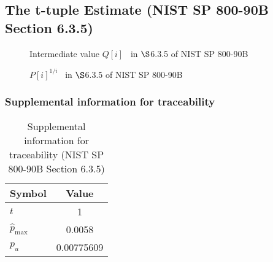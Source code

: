 \documentclass[a3paper,xelatex,english]{bxjsarticle}
\begin{document}
\subsection{The t-tuple Estimate (NIST SP 800-90B Section 6.3.5)}\label{sec:NonBinary635}

\begin{figure}[htbp]
\centering


\caption{Intermediate value $Q[i]$ \, in $\S$6.3.5 of NIST SP 800-90B}
\end{figure}
\begin{figure}[htbp]
\centering


\caption{$P[i]^{1/i}$ \, in $\S$6.3.5 of NIST SP 800-90B}
\end{figure}
\clearpage
\subsubsection{Supplemental information for traceability}
\renewcommand{\arraystretch}{1.8}
\begin{table}[h]
\caption{Supplemental information for traceability (NIST SP 800-90B Section 6.3.5)}
\begin{center}
\begin{tabular}{|l|c|}
\hline 
\rowcolor{anotherlightblue} %
Symbol				& Value \\ \hline 
$t$				&        1\\ \hline 
$\hat{p}_{\textrm{max}}$ 			&   0.0058\\ \hline
$p_u$				& 0.00775609\\ \hline
\end{tabular}
\end{center}
\end{table}
\renewcommand{\arraystretch}{1.4}
\clearpage
\end{document}

